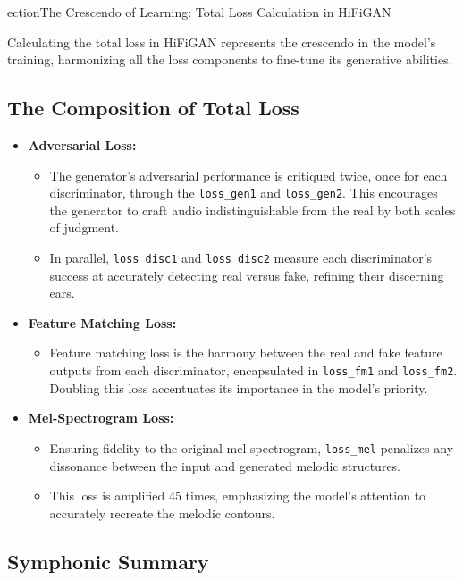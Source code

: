 \documentclass[a4paper]{article}
\begin{document}
ection{The Crescendo of Learning: Total Loss Calculation in HiFiGAN}

Calculating the total loss in HiFiGAN represents the crescendo in the model's training, harmonizing all the loss components to fine-tune its generative abilities.

\subsection*{The Composition of Total Loss}

\begin{itemize}
  \item \textbf{Adversarial Loss:}
  \begin{itemize}
    \item The generator's adversarial performance is critiqued twice, once for each discriminator, through the \verb|loss_gen1| and \verb|loss_gen2|. This encourages the generator to craft audio indistinguishable from the real by both scales of judgment.
    
    \item In parallel, \verb|loss_disc1| and \verb|loss_disc2| measure each discriminator's success at accurately detecting real versus fake, refining their discerning ears.
  \end{itemize}
  
  \item \textbf{Feature Matching Loss:}
  \begin{itemize}
    \item Feature matching loss is the harmony between the real and fake feature outputs from each discriminator, encapsulated in \verb|loss_fm1| and \verb|loss_fm2|. Doubling this loss accentuates its importance in the model's priority.
  \end{itemize}
  
  \item \textbf{Mel-Spectrogram Loss:}
  \begin{itemize}
    \item Ensuring fidelity to the original mel-spectrogram, \verb|loss_mel| penalizes any dissonance between the input and generated melodic structures.
    \item This loss is amplified 45 times, emphasizing the model's attention to accurately recreate the melodic contours.
  \end{itemize}
\end{itemize}

\subsection*{Symphonic Summary}
\end{document}
